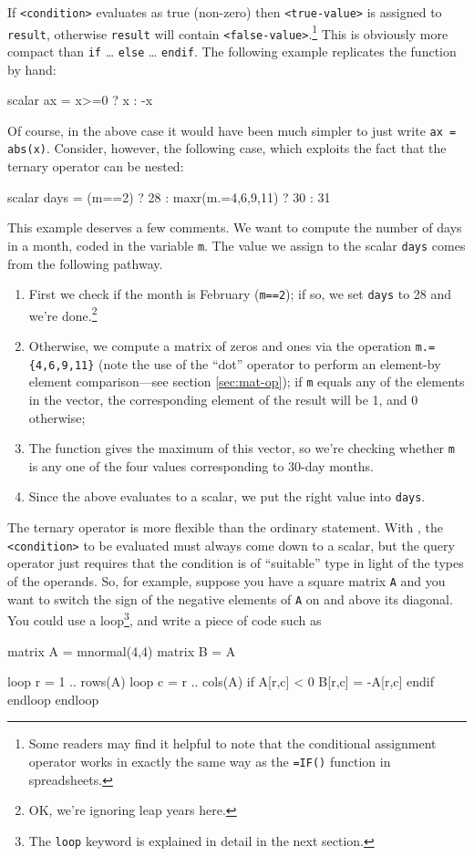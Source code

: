 If \texttt{<condition>} evaluates as true (non-zero) then
\texttt{<true-value>} is assigned to \texttt{result}, otherwise
\texttt{result} will contain \texttt{<false-value>}.\footnote{Some
  readers may find it helpful to note that the conditional assignment
  operator works in exactly the same way as the \texttt{=IF()} function
  in spreadsheets.}  This is obviously more compact than \texttt{if}
\dots{} \texttt{else} \dots{} \texttt{endif}. The following example
replicates the  function by hand:
\begin{code}
scalar ax = x>=0 ? x : -x
\end{code}
Of course, in the above case it would have been much simpler to just
write \texttt{ax = abs(x)}. Consider, however, the following case,
which exploits the fact that the ternary operator can be nested:
\begin{code}
scalar days = (m==2) ? 28 : maxr(m.={4,6,9,11}) ? 30 : 31
\end{code}
This example deserves a few comments. We want to compute the number of
days in a month, coded in the variable \texttt{m}. The value we assign
to the scalar \texttt{days} comes from the following pathway.
\begin{enumerate}
\item First we check if the month is February (\texttt{m==2}); if so,
  we set \texttt{days} to 28 and we're done.\footnote{OK, we're ignoring
    leap years here.}
\item Otherwise, we compute a matrix of zeros and ones via the
  operation \verb|m.={4,6,9,11}| (note the use of the ``dot'' operator
  to perform an element-by element comparison---see section
  \ref{sec:mat-op}); if \texttt{m} equals any of the elements in the
  vector, the corresponding element of the result will be 1, and
  0 otherwise;
\item The  function gives the maximum of this vector, so
  we're checking whether \texttt{m} is any one of the four values
  corresponding to 30-day months.
\item Since the above evaluates to a scalar, we put the right value
  into \texttt{days}.
\end{enumerate}

The ternary operator is more flexible than the ordinary 
statement. With , the \texttt{<condition>} to be evaluated
must always come down to a scalar, but the query operator just
requires that the condition is of ``suitable'' type in light of the
types of the operands.  So, for example, suppose you have a square
matrix \texttt{A} and you want to switch the sign of the negative
elements of \texttt{A} on and above its diagonal. You could use a
loop\footnote{The \texttt{loop} keyword is explained in detail in the
  next section.}, and write a piece of code such as
\begin{code}
matrix A = mnormal(4,4)
matrix B = A

loop r = 1 .. rows(A)
  loop c = r .. cols(A)
     if A[r,c] < 0
       B[r,c] = -A[r,c]
     endif
  endloop
endloop
\end{code}

